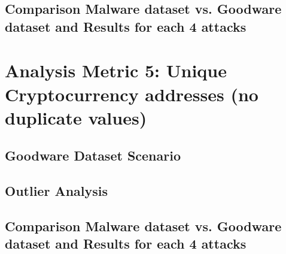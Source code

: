 \subsection{Comparison Malware dataset vs. Goodware dataset and Results for each 4 attacks}

\newpage

\section{Analysis Metric 5: Unique Cryptocurrency addresses (no duplicate values)}

\subsection{Goodware Dataset Scenario}


\subsection{Outlier Analysis}


\subsection{Comparison Malware dataset vs. Goodware dataset and Results for each 4 attacks}

\newpage























